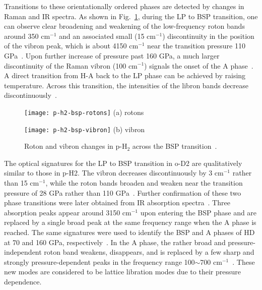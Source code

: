 Transitions to these orientationally ordered phases are detected by changes in Raman and IR spectra. As shown in Fig.~\ref{fig:hsolid-p-h2-bsp}, during the LP to BSP transition, one can observe clear broadening and weakening of the low-frequency roton bands around 350 cm$^{-1}$ and an associated small (15 cm$^{-1}$) discontinuity in the position of the vibron peak, which is about 4150 cm$^{-1}$ near the transition pressure 110 GPa~\cite{Lorenzana1990}. Upon further increase of pressure past 160 GPa, a much larger discontinuity of the Raman vibron (100 cm$^{-1}$) signals the onset of the A phase~\cite{Hemley1988,Lorenzana1989}. A direct transition from H-A back to the LP phase can be achieved by raising temperature. Across this transition, the intensities of the libron bands decrease discontinuously~\cite{Lorenzana1990}.

\begin{figure}[h]
\centering
\begin{minipage}{0.38\columnwidth}
\centering
\texttt{[image: p-h2-bsp-rotons]}
(a) rotons
\end{minipage}
\begin{minipage}{0.58\columnwidth}
\centering
\texttt{[image: p-h2-bsp-vibron]}
(b) vibron
\end{minipage}
\caption{Roton and vibron changes in p-H$_2$ across the BSP transition~\cite{Lorenzana1990}.}
\label{fig:hsolid-p-h2-bsp}
\end{figure}

The optical signatures for the LP to BSP transition in o-D2 are qualitatively similar to those in p-H2. The vibron decreases discontinuously by 3 cm$^{-1}$ rather than 15 cm$^{-1}$, while the roton bands broaden and weaken near the transition pressure of 28 GPa rather than 110 GPa~\cite{Silvera1981}. Further confirmation of these two phase transitions were later obtained from IR absorption spectra~\cite{Cui1994}. Three absorption peaks appear around 3150 cm$^{-1}$ upon entering the BSP phase and are replaced by a single broad peak at the same frequency range when the A phase is reached. The same signatures were used to identify the BSP and A phases of HD at 70 and 160 GPa, respectively~\cite{Chijioke2006}.
In the A phase, the rather broad and pressure-independent roton band weakens, disappears, and is replaced by a few sharp and strongly pressure-dependent peaks in the frequency range 100$\sim$700 cm$^{-1}$~\cite{Goncharov1998}.
These new modes are considered to be lattice libration modes due to their pressure dependence.

